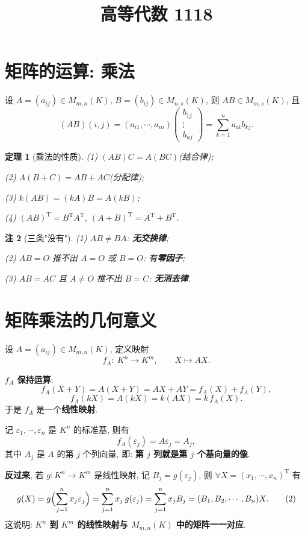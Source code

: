 \documentclass[UTF8,11pt]{ctexart}
\title{高等代数 1118}
\date{}
\theoremstyle{cnthm}
\newtheorem{thm}{定理}[section]
\newtheorem{rem}[thm]{注}
\begin{document}
\maketitle

\section{矩阵的运算: 乘法}

设 $A=(a_{ij})\in M_{m,n}(K)$, $B=(b_{ij})\in M_{n,s}(K)$, 则 $AB\in M_{m,s}(K)$, 且
\begin{equation}
(AB)(i,j)=(a_{i1},\cdots,a_{in})
\begin{pmatrix}b_{1j}\\\vdots\\b_{nj}\end{pmatrix}
=\sum_{k=1}^{n}a_{ik}b_{kj}.
\tag{1}
\end{equation}

\begin{thm}[乘法的性质]
(1) $(AB)C=A(BC)$(结合律);

(2) $A(B+C)=AB+AC$(分配律);

(3) $k(AB)=(kA)B=A(kB)$;

(4) $(AB)^{\mathrm T}=B^{\mathrm T}A^{\mathrm T}$, $(A+B)^{\mathrm T}=A^{\mathrm T}+B^{\mathrm T}$.
\end{thm}

\begin{rem}[三条"没有"]
(1) $AB\neq BA$: \textbf{无交换律};

(2) $AB=O$ 推不出 $A=O$ 或 $B=O$: 有\textbf{零因子};

(3) $AB=AC$ 且 $A\neq O$ 推不出 $B=C$: \textbf{无消去律}.
\end{rem}

\section{矩阵乘法的几何意义}

设 $A=(a_{ij})\in M_{m,n}(K)$, 定义映射
\[
f_A:\ K^n\longrightarrow K^m,\qquad X\longmapsto AX .
\]

\textbf{$f_A$ 保持运算}:
\[
f_A(X+Y)=A(X+Y)=AX+AY=f_A(X)+f_A(Y),
\]
\[
f_A(kX)=A(kX)=k(AX)=k\,f_A(X).
\]
于是 $f_A$ 是一个\textbf{线性映射}.

记 $\varepsilon_1,\cdots,\varepsilon_n$ 是 $K^n$ 的标准基, 则有
\[
f_A(\varepsilon_j)=A\varepsilon_j=A_j,
\]
其中 $A_j$ 是 $A$ 的第 $j$ 个列向量, 即: \textbf{第 $j$ 列就是第 $j$ 个基向量的像}.

\textbf{反过来}, 若 $g:K^n\to K^m$ 是线性映射, 记 $B_j=g(\varepsilon_j)$, 则 $\forall X=(x_1,\cdots,x_n)^{\mathrm T}$ 有
\begin{equation}
g(X)=g\Bigl(\sum_{j=1}^{n}x_j\varepsilon_j\Bigr)
=\sum_{j=1}^{n}x_j\,g(\varepsilon_j)
=\sum_{j=1}^{n}x_jB_j
=(B_1,B_2,\cdots,B_n)X .
\tag{2}
\end{equation}
这说明: \textbf{$K^n$ 到 $K^m$ 的线性映射与 $M_{m,n}(K)$ 中的矩阵一一对应}.
\end{document}
